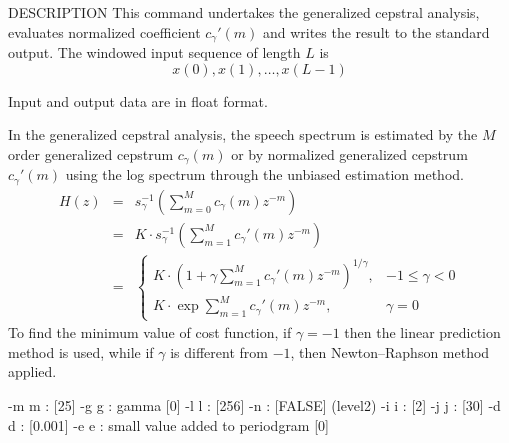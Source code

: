 \begin{qsection}{DESCRIPTION}
This command undertakes the generalized cepstral analysis,
evaluates normalized coefficient $c_\gamma'(m)$
and writes the result to the standard output.
The windowed input sequence of length $L$ is
\begin{displaymath}
  x(0),x(1),\ldots,x(L-1)
\end{displaymath}
\par
Input and output data are in float format.
\par
In the generalized cepstral analysis,
the speech spectrum is estimated by the $M$ order generalized
cepstrum $c_\gamma(m)$ or by normalized generalized cepstrum 
$c_\gamma'(m)$ using the log spectrum through the unbiased estimation
method.
\begin{eqnarray*}
H(z) &=& s_\gamma^{-1}\left(
	\sum_{m=0}^{M} c_\gamma(m)z^{-m} \right) \\
     &=& K \cdot s_\gamma^{-1}\left(
	\sum_{m=1}^{M} c_\gamma'(m)z^{-m} \right) \\
     &=& \left\{ \begin{array}{ll} \displaystyle
	K\cdot \left( 1+\gamma\sum_{m=1}^{M} c_\gamma'(m)z^{-m}
		\right)^{1/\gamma}, & -1 \leq \gamma < 0 \\
	\displaystyle K\cdot \exp \sum_{m=1}^{M} c_\gamma'(m)z^{-m}, 
		& \gamma=0
	\end{array} \right.
\end{eqnarray*}
To find the minimum value of cost function,
if $\gamma=-1$ then the linear prediction method is used,
while if $\gamma$ is different from $-1$, then
Newton--Raphson method applied.
\end{qsection}

\begin{options}
       -m m  :     [25]
       -g g  : gamma                            [0]
       -l l  :                      [256]
       -n    :        [FALSE]
     (level2)
       -i i  :                 [2]
       -j j  :                 [30]
       -d d  :                     [0.001]
       -e e  : small value added to periodgram  [0]
\end{options}

